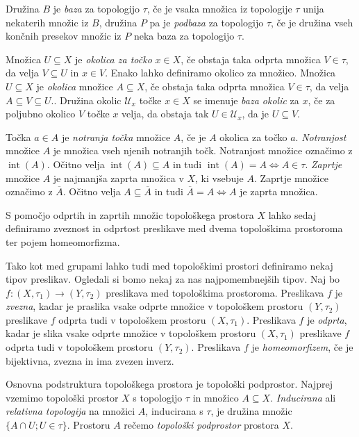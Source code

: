 \documentclass[mat1]{fmfdelo}
\newcommand{\Ucurl}{\mathcal{U}}
\newcommand{\closure}[1]{\overline{#1}}
\DeclareMathOperator{\interior}{int}
\begin{document}
Družina $B$ je \emph{baza} za topologijo $\tau$, če je vsaka množica iz topologije $\tau$ unija nekaterih množic iz $B$, družina $P$ pa je \emph{podbaza} za topologijo $\tau$, če je družina vseh končnih presekov množic iz $P$ neka baza za topologijo $\tau$.

Množica $U \subseteq X$ je \emph{okolica za točko} $x \in X$, če obstaja taka odprta množica $V \in \tau$, da velja $V \subseteq U$ in $x \in V$. Enako lahko definiramo okolico za množico.
Množica $U \subseteq X$ je \emph{okolica} množice $A \subseteq X$, če obstaja taka odprta množica $V \in \tau$, da velja $A \subseteq V \subseteq U$..
Družina okolic $\Ucurl_x$ točke $x \in X$ se imenuje \emph{baza okolic} za $x$, če za poljubno okolico $V$ točke $x$ velja, da obstaja tak $U \in \Ucurl_x$, da je $U \subseteq V$.

Točka $a \in A$ je \emph{notranja točka} množice $A$, če je $A$ okolica za točko $a$.
\emph{Notranjost} množice $A$ je množica vseh njenih notranjih točk. Notranjost množice označimo z $\interior(A)$. Očitno velja $\interior(A) \subseteq A$ in tudi $\interior(A) = A \iff A \in \tau$.
\emph{Zaprtje} množice $A$ je najmanjša zaprta množica v $X$, ki vsebuje $A$. Zaprtje množice označimo z $\closure{A}$. Očitno velja $A \subseteq \closure{A}$ in tudi $\closure{A} = A \iff A$ je zaprta množica.

S pomočjo odprtih in zaprtih množic topološkega prostora $X$ lahko sedaj definiramo zveznost in odprtost preslikave med dvema topološkima prostoroma ter pojem homeomorfizma.

Tako kot med grupami lahko tudi med topološkimi prostori definiramo nekaj tipov preslikav. Ogledali si bomo nekaj za nas najpomembnejših tipov.
Naj bo $f\colon (X, \tau_1) \to (Y, \tau_2)$ preslikava med topološkima prostoroma.
Preslikava $f$ je \emph{zvezna}, kadar je praslika vsake odprte množice v topološkem prostoru $(Y, \tau_2)$  preslikave $f$ odprta tudi v topološkem prostoru $(X, \tau_1)$.
Preslikava $f$ je \emph{odprta}, kadar je slika vsake odprte množice v topološkem prostoru $(X, \tau_1)$ preslikave $f$ odprta tudi v topološkem prostoru $(Y, \tau_2)$.
Preslikava $f$ je \emph{homeomorfizem}, če je bijektivna, zvezna in ima zvezen inverz.

Osnovna podstruktura topološkega prostora je topološki podprostor.
Najprej vzemimo topološki prostor $X$ s topologijo $\tau$ in množico $A \subseteq X$. \emph{Inducirana} ali \emph{relativna topologija} na množici $A$, inducirana s $\tau$, je družina množic $\lbrace A \cap U ; U \in \tau \rbrace$. Prostoru $A$ rečemo \emph{topološki podprostor} prostora $X$.
\end{document}
